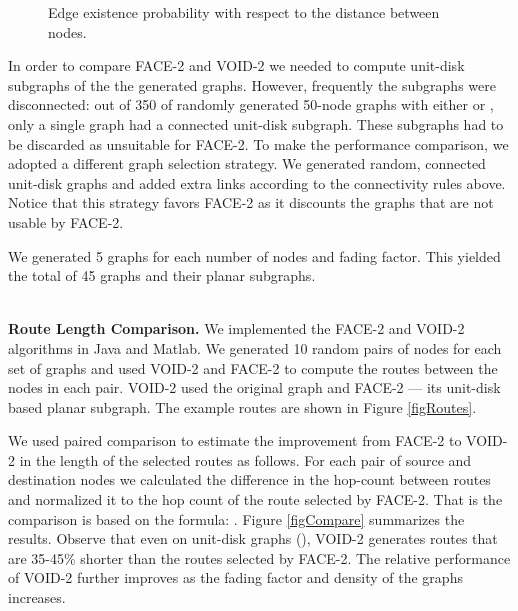 \documentclass[conference]{IEEEtran}
\begin{document}
\begin{figure} 
\center 
{}
\caption{Edge existence probability with respect to the distance
         between nodes.}
\label{figProbability}
\end{figure}


\begin{figure*}[ht]
\begin{minipage}[b]{.47\linewidth}
\end{minipage}\hfill
\begin{minipage}[b]{.47\linewidth}
\end{minipage}
\caption{Example routes selected by VOID-2 and FACE-2 between nodes 27
and 11 in a 50-node graph and its unit-disk based subgraph respectively.
The fading factor  is 2.}
\label{figRoutes}
\end{figure*}


In order to compare FACE-2 and VOID-2 we needed to compute unit-disk
subgraphs of the the generated graphs. However, frequently the
subgraphs were disconnected: out of 350 of randomly generated 50-node
graphs with  either  or , only a single graph had a connected
unit-disk subgraph. These subgraphs had to be discarded as unsuitable
for FACE-2. To make the performance comparison, we adopted a different
graph selection strategy. We generated random, connected unit-disk
graphs and added extra links according to the connectivity rules
above. Notice that this strategy favors FACE-2 as it discounts the
graphs that are not usable by FACE-2.

We generated 5 graphs for each number of nodes and fading factor.
This yielded the total of 45 graphs and their planar subgraphs.

\ \\ \textbf{Route Length Comparison.} We implemented the FACE-2 and
VOID-2 algorithms in Java and Matlab. We generated 10 random pairs of
nodes for each set of graphs and used VOID-2 and FACE-2 to compute the
routes between the nodes in each pair. VOID-2 used the original graph
and FACE-2 --- its unit-disk based planar subgraph. The
example routes are shown in Figure \ref{figRoutes}.

We used paired comparison to estimate the improvement from FACE-2 to
VOID-2 in the length of the selected routes as follows. For each pair
of source and destination nodes we calculated the difference in the
hop-count between routes and normalized it to the hop count of the
route selected by FACE-2. That is the comparison is based on the
formula: . Figure
\ref{figCompare} summarizes the results. Observe that even on
unit-disk graphs (), VOID-2 generates routes that are 35-45\%
shorter than the routes selected by FACE-2. The relative performance
of VOID-2 further improves as the fading factor and density of the
graphs increases.
\end{document}
